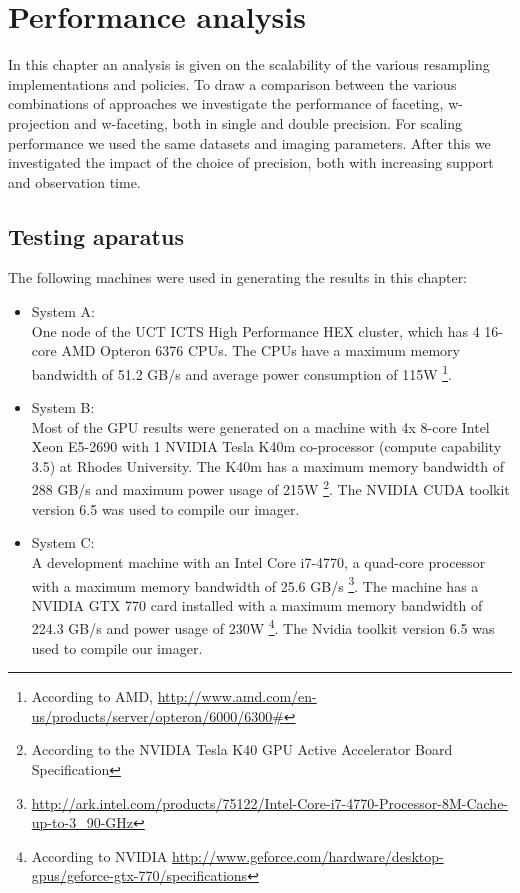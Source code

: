 \chapter{Performance analysis}
In this chapter an analysis is given on the scalability of the various resampling implementations and policies. To draw a comparison between the various combinations
of approaches we investigate the performance of faceting, w-projection and w-faceting, both in single and double precision. For scaling performance we used the 
same datasets and imaging parameters. After this we investigated the impact of the choice of precision, both with increasing support and observation time.

\section{Testing aparatus}
The following machines were used in generating the results in this chapter:
\begin{itemize}
 \item System A:\\
 One node of the UCT ICTS High Performance HEX cluster, which has 4 16-core AMD Opteron 6376 CPUs. The CPUs have a maximum memory bandwidth of 
 51.2 GB/s and average power consumption of 115W \footnote{According to AMD, \url{http://www.amd.com/en-us/products/server/opteron/6000/6300\#}}.
 \item System B:\\
 Most of the GPU results were generated on a machine with 4x 8-core Intel Xeon E5-2690 with 1 NVIDIA Tesla K40m co-processor (compute capability 3.5) at Rhodes University. The K40m has a maximum
 memory bandwidth of 288 GB/s and maximum power usage of 215W \footnote{According to the NVIDIA Tesla K40 GPU Active Accelerator Board Specification}. The NVIDIA CUDA toolkit 
 version 6.5 was used to compile our imager. 
 \item System C:\\
 A development machine with an Intel Core i7-4770, a quad-core processor with a maximum memory bandwidth of 25.6 GB/s \footnote{\url{http://ark.intel.com/products/75122/Intel-Core-i7-4770-Processor-8M-Cache-up-to-3_90-GHz}}. 
 The machine has a NVIDIA GTX 770 card installed with a maximum memory bandwidth of 224.3 GB/s and power usage of 
 230W \footnote{According to NVIDIA \url{http://www.geforce.com/hardware/desktop-gpus/geforce-gtx-770/specifications}}. The Nvidia toolkit version 6.5 was used to compile our imager.
\end{itemize}

